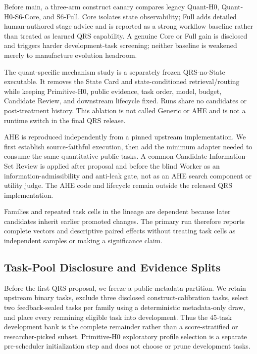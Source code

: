 Before main, a three-arm construct canary compares legacy Quant-H0,
Quant-H0-S6-Core, and S6-Full. Core isolates state observability; Full adds
detailed human-authored stage advice and is reported as a strong workflow
baseline rather than treated as learned QRS capability. A genuine Core or Full
gain is disclosed and triggers harder development-task screening; neither
baseline is weakened merely to manufacture evolution headroom.

The quant-specific mechanism study is a separately frozen QRS-no-State
executable. It removes the State Card and state-conditioned retrieval/routing
while keeping Primitive-H0, public evidence, task order, model, budget,
Candidate Review, and downstream lifecycle fixed. Runs share no candidates or
post-treatment history. This ablation is not called Generic or AHE and is not a
runtime switch in the final QRS release.

AHE is reproduced independently from a pinned upstream implementation. We
first establish source-faithful execution, then add the minimum adapter needed
to consume the same quantitative public tasks. A common Candidate
Information-Set Review is applied after proposal and before the blind Worker as
an information-admissibility and anti-leak gate, not as an AHE search component
or utility judge. The AHE code and lifecycle remain outside the released QRS
implementation.

Families and repeated task cells in the lineage are dependent because later
candidates inherit earlier promoted changes. The primary run therefore reports
complete vectors and descriptive paired effects without treating task cells as
independent samples or making a significance claim.

\subsection{Task-Pool Disclosure and Evidence Splits}

Before the first QRS proposal, we freeze a public-metadata partition. We retain
upstream binary tasks, exclude three disclosed construct-calibration tasks,
select two feedback-sealed tasks per family using a deterministic metadata-only
draw, and place every remaining eligible task into development. Thus the
45-task development bank is the complete remainder rather than a
score-stratified or researcher-picked subset. Primitive-H0 exploratory profile
selection is a separate pre-scheduler initialization step and does not choose
or prune development tasks.

